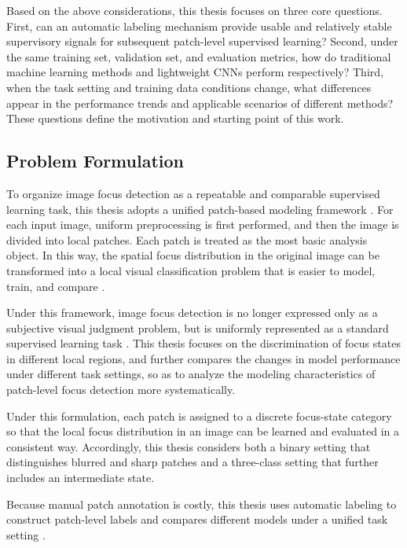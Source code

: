 \par Based on the above considerations, this thesis focuses on three core
questions. First, can an automatic labeling mechanism provide usable and
relatively stable supervisory signals for subsequent patch-level supervised
learning? Second, under the same training set, validation set, and evaluation
metrics, how do traditional machine learning methods and lightweight CNNs
perform respectively? Third, when the task setting and training data conditions
change, what differences appear in the performance trends and applicable
scenarios of different methods? These questions define the motivation and
starting point of this work.

\subsection{Problem Formulation}

\par To organize image focus detection as a repeatable and comparable supervised
learning task, this thesis adopts a unified patch-based modeling framework . For
each input image, uniform preprocessing is first performed, and then the image
is divided into local patches. Each patch is treated as the most basic analysis
object. In this way, the spatial focus distribution in the original image can be
transformed into a local visual classification problem that is easier to model,
train, and compare \cite{Hou_2016_CVPR}.

\par Under this framework, image focus detection is no longer expressed only as
a subjective visual judgment problem, but is uniformly represented as a standard
supervised learning task \cite[pp.~1--8]{murphy2022pml}. This thesis focuses on
the discrimination of focus states in different local regions, and further
compares the changes in model performance under different task settings, so as
to analyze the modeling characteristics of patch-level focus detection more
systematically.

\par Under this formulation, each patch is assigned to a discrete focus-state
category so that the local focus distribution in an image can be learned and
evaluated in a consistent way. Accordingly, this thesis considers both a binary
setting that distinguishes blurred and sharp patches and a three-class setting
that further includes an intermediate state.

\par Because manual patch annotation is costly, this thesis uses automatic
labeling to construct patch-level labels and compares different models under a
unified task setting \cite{5739529,1284395}.

